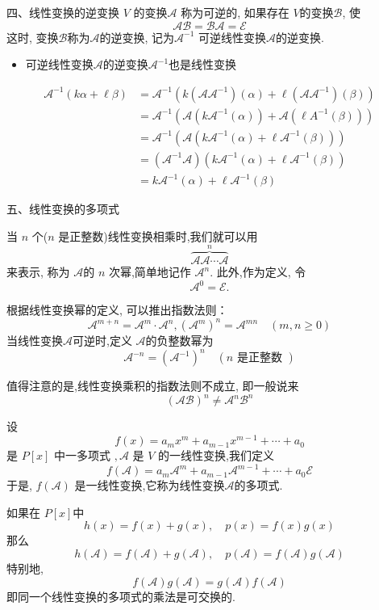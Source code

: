\documentclass[13pt]{beamer}
\def\A{\mathscr{A}}
\def\B{\mathscr{B}}
\def\E{\mathscr{E}}
\begin{document}
\begin{frame}{四、线性变换的逆变换}
${V}$ 的变换$\A$ 称为可逆的, 如果存在 $V$的变换$\B$, 使
\[
\A \B=\B \A=\E
\]
这时, 变换$\B$称为$\A$的逆变换, 记为$\A^{-1}$
可逆线性变换$\A$的逆变换. 
\begin{itemize}
\item 可逆线性变换$\A$的逆变换$\A^{-1}$也是线性变换
\end{itemize}
\begin{align*} 
\A^{-1}(k \alpha+\ell \beta) &= \A^{-1}\left(k\left(\A \A^{-1}\right)(\alpha)+\ell\left(\A \A^{-1}\right)(\beta)\right) \\ &=\A^{-1}\left(\A\left(k \A^{-1}(\alpha)\right)+\A\left( \ell A^{-1}(\beta)\right)\right) \\ 
&=\A^{-1}\left(\A\left(k \A^{-1}(\alpha)+\ell \A^{-1}(\beta)\right)\right) \\
 &=\left(\A^{-1} \A\right)\left(k \A^{-1}(\alpha)+\ell \A^{-1}(\beta)\right) \\
  &=k \A^{-1}(\alpha)+\ell \A^{-1}(\beta) 
  \end{align*}

\end{frame}


\begin{frame}{五、线性变换的多项式}
\small{
当 $n$ 个($n$ 是正整数)线性变换相乘时,我们就可以用
\[
\overbrace{\A \A \cdots\A}^{n}
\]
来表示, 称为 $\A$的 $n$ 次幂,简单地记作 $\A^n$.
此外,作为定义, 令
$$
\mathscr{A}^{0}=\mathscr{E}.
$$

根据线性变换幂的定义, 可以推出指数法则：
\[
\mathscr{A}^{m+n}=\mathscr{A}^{m} \cdot \mathscr{A}^{n},\left(\mathscr{A}^{m}\right)^{n}=\mathscr{A}^{m n} \quad(m, n \geqslant 0)
\]
当线性变换$\A$可逆时,定义 $\A$的负整数幂为
\[
\mathscr{A}^{-n}=\left(\mathscr{A}^{-1}\right)^{n} \quad(n \text { 是正整数 })
\]

值得注意的是,线性变换乘积的指数法则不成立, 即一般说来\[
(\mathscr{A} \mathscr{B})^{n} \neq \mathscr{A}^{n} \mathscr{B}^{n}
\] }
\end{frame}


\begin{frame}


设
\[
f(x)=a_{m} x^{m}+a_{m-1} x^{m-1}+\cdots+a_{0}
\]
是 $P[x]$ 中一多项式 $, \mathscr{A}$ 是 $V$ 的一线性变换,我们定义
\[
f(\A)=a_{m} \mathscr{A}^{m}+a_{m-1} \mathscr{A}^{m-1}+\cdots+a_{0} \mathscr{E}
\]
于是, $f(\A)$ 是一线性变换,它称为线性变换$\A$的多项式. 

如果在 $P[x]$中
\[
h(x)=f(x)+g(x),  \quad  p(x)=f(x) g(x)
\]
那么
\[
h(\mathscr{\A})=f(\mathscr{A})+g(\mathscr{A}), \quad p(\mathscr{A})=f(\mathscr{A}) g(\mathscr{A})
\]
特别地, 
\[
f(\A) g(\A)=g(\mathscr{A}) f(\mathscr{A})
\]
即同一个线性变换的多项式的乘法是可交换的.  

\end{frame}
\end{document}
